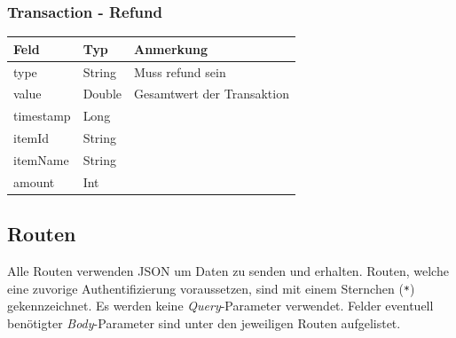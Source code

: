 \documentclass[a4paper, 11pt]{article}
\begin{document}
\subsubsection*{Transaction - Refund}
\label{subsubsec:attachments:schemas:refund}
\begin{table}[H]
	\centering
	\begin{tabular}{@{}lll@{}}
		Feld      & Typ    & Anmerkung                     \\ \toprule
		type      & String & Muss \glqq refund\grqq{} sein \\ \midrule
		value     & Double & Gesamtwert der Transaktion    \\ \midrule
		timestamp & Long   &                               \\ \midrule
		itemId    & String &                               \\ \midrule
		itemName  & String &                               \\ \midrule
		amount    & Int    &                               \\ \bottomrule
	\end{tabular}
	\label{tab:attachments:schemas:refund}
\end{table}

\subsection*{Routen}
\label{subsec:attachments:routes}

Alle Routen verwenden JSON um Daten zu senden und erhalten.
Routen, welche eine zuvorige Authentifizierung voraussetzen, sind mit einem Sternchen (\verb|*|) gekennzeichnet.
Es werden keine \textit{Query}-Parameter verwendet.
Felder eventuell benötigter \textit{Body}-Parameter sind unter den jeweiligen Routen aufgelistet.
\end{document}
